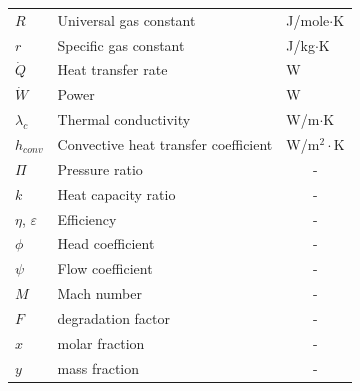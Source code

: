 \documentclass[12pt,a4paper]{report}
\begin{document}
\begin{longtable}[c]{lll}
$R$          & Universal gas constant                      & J/mole$\cdot$K \\
$r$          & Specific gas constant                       & J/kg$\cdot$K   \\
$\dot{Q}$    & Heat transfer rate                          & W              \\
$\dot{W}$    & Power                                       & W              \\
$\lambda_c$  & Thermal conductivity                        & W/m$\cdot$K    \\
$h_{conv}$   & Convective heat transfer coefficient        &  W/m$^2\cdot$K \\
$\Pi$        & Pressure ratio                              & \multicolumn{1}{c}{-} \\
$k$          & Heat capacity ratio                         & \multicolumn{1}{c}{-} \\
$\eta$, $\varepsilon$       & Efficiency                   & \multicolumn{1}{c}{-} \\
$\phi$ & Head coefficient                                  & \multicolumn{1}{c}{-} \\
$\psi$ & Flow coefficient                                  & \multicolumn{1}{c}{-} \\
$M$ & Mach number                                          & \multicolumn{1}{c}{-} \\ 
$F$ & degradation factor                                   & \multicolumn{1}{c}{-} \\
$x$ & molar fraction                                       & \multicolumn{1}{c}{-} \\
$y$ & mass fraction                                        & \multicolumn{1}{c}{-} \\

\end{longtable}
\endgroup
\end{document}
